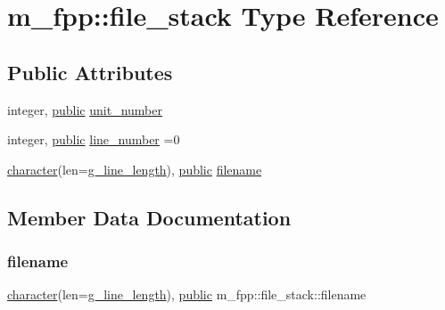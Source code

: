 \hypertarget{structm__fpp_1_1file__stack}{}\section{m\+\_\+fpp\+:\+:file\+\_\+stack Type Reference}
\label{structm__fpp_1_1file__stack}
\subsection*{Public Attributes}
\begin{DoxyCompactItemize}
\item 
integer, \hyperlink{M__stopwatch_83_8txt_a2f74811300c361e53b430611a7d1769f}{public} \hyperlink{structm__fpp_1_1file__stack_ae9e32b72849f30fd750412794eb746ca}{unit\+\_\+number}
\item 
integer, \hyperlink{M__stopwatch_83_8txt_a2f74811300c361e53b430611a7d1769f}{public} \hyperlink{structm__fpp_1_1file__stack_af76b002b417450266cb8ec6e18a540c2}{line\+\_\+number} =0
\item 
\hyperlink{option__stopwatch_83_8txt_abd4b21fbbd175834027b5224bfe97e66}{character}(len=\hyperlink{namespacem__fpp_ab93f8756cf248cf8db932573009d4664}{g\+\_\+line\+\_\+length}), \hyperlink{M__stopwatch_83_8txt_a2f74811300c361e53b430611a7d1769f}{public} \hyperlink{structm__fpp_1_1file__stack_aebc395003a75f6f40baba920a72f46e0}{filename}
\end{DoxyCompactItemize}


\subsection{Member Data Documentation}
\mbox{\label{structm__fpp_1_1file__stack_aebc395003a75f6f40baba920a72f46e0}} 
\subsubsection{\texorpdfstring{filename}{filename}}
{\footnotesize\ttfamily \hyperlink{option__stopwatch_83_8txt_abd4b21fbbd175834027b5224bfe97e66}{character}(len=\hyperlink{namespacem__fpp_ab93f8756cf248cf8db932573009d4664}{g\+\_\+line\+\_\+length}), \hyperlink{M__stopwatch_83_8txt_a2f74811300c361e53b430611a7d1769f}{public} m\+\_\+fpp\+::file\+\_\+stack\+::filename}


